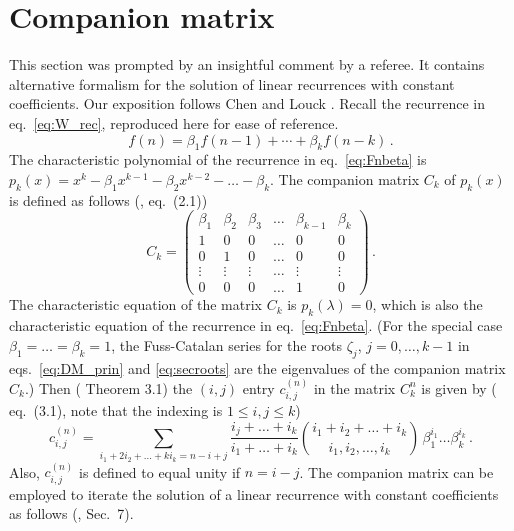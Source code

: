 \documentclass[review]{elsarticle}
\theoremstyle{plain}
\begin{document}
\section{Companion matrix}\label{sec:compmtx}
This section was prompted by an insightful comment by a referee.
It contains alternative formalism for the solution of linear recurrences with constant coefficients.
Our exposition follows Chen and Louck \cite{ChenLouck}.
Recall the recurrence in eq.~\eqref{eq:W_rec}, reproduced here for ease of reference.
\begin{equation}
\label{eq:Fnbeta}
f(n) = \beta_1f(n-1) +\cdots +\beta_kf(n-k) \,.
\end{equation}
The characteristic polynomial of the recurrence in eq.~\eqref{eq:Fnbeta} is
$p_k(x) = x^k -\beta_1x^{k-1} -\beta_2x^{k-2} -\dots -\beta_k$.
The companion matrix $C_k$ of $p_k(x)$ is defined as follows (\cite{ChenLouck}, eq.~(2.1))
\begin{equation}
\label{eq:ck}
  C_k = \begin{pmatrix} \beta_1 & \beta_2 & \beta_3 & \dots & \beta_{k-1} & \beta_k \\
    1 & 0 & 0 & \dots & 0 & 0 \\
    0 & 1 & 0 & \dots & 0 & 0 \\
    \vdots & \vdots &\vdots & \dots & \vdots & \vdots \\
    0 & 0 & 0 & \dots & 1 & 0
    \end{pmatrix} \,.
\end{equation}
The characteristic equation of the matrix $C_k$ is $p_k(\lambda)=0$, which is also
the characteristic equation of the recurrence in eq.~\eqref{eq:Fnbeta}.
(For the special case $\beta_1=\dots=\beta_k=1$,
the Fuss-Catalan series for the roots $\zeta_j$, $j=0,\dots,k-1$ in
eqs.~\eqref{eq:DM_prin} and \eqref{eq:secroots}
are the eigenvalues of the companion matrix $C_k$.)
Then (\cite{ChenLouck} Theorem 3.1) the $(i,j)$ entry $c_{i,j}^{(n)}$ in the matrix $C_k^n$ is given by  
(\cite{ChenLouck} eq.~(3.1), note that the indexing is $1 \le i,j \le k$)
\begin{equation}
\label{eq:cijn}
  c_{i,j}^{(n)} = \sum_{i_1+2i_2+\dots+ki_k = n-i+j} \frac{i_j+\dots+i_k}{i_1+\dots+i_k}
  \binom{i_1+i_2+\dots+i_k}{i_1,i_2,\dots, i_k}\,\beta_1^{i_1}\dots\beta_k^{i_k} \,.
\end{equation}
Also, $c_{i,j}^{(n)}$ is defined to equal unity if $n=i-j$.
The companion matrix can be employed to iterate the solution of a
linear recurrence with constant coefficients as follows (\cite{ChenLouck}, Sec.~7).
\end{document}
